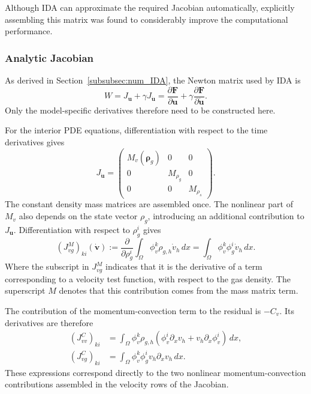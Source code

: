 Although IDA can approximate the required Jacobian automatically, explicitly assembling this matrix was found to considerably improve the computational performance.

\subsubsection{Analytic Jacobian}

As derived in Section~\ref{subsubsec:num_IDA}, the Newton matrix used by IDA is
\begin{equation}\label{eq:model4_IDA_jacobian}
W=J_{\mathbf u}+\gamma J_{\dot{\mathbf u}}
=\frac{\partial\mathbf F}{\partial\mathbf u}
+\gamma\frac{\partial\mathbf F}{\partial\dot{\mathbf u}}.
\end{equation}
Only the model-specific derivatives therefore need to be constructed here.

For the interior PDE equations, differentiation with respect to the time derivatives gives
\begin{equation}\label{eq:model4_Jdu}
J_{\dot{\mathbf u}}=
\begin{pmatrix}
M_v(\boldsymbol\rho_g)&0&0\\
0&M_{\rho_g}&0\\
0&0&M_{\rho_s}
\end{pmatrix}.
\end{equation}
The constant density mass matrices are assembled once. The nonlinear part of $M_v$ also depends on the state vector $\rho_g$, introducing an additional contribution to $J_{\mathbf u}$. Differentiation with respect to $\rho_g^i$ gives
\begin{equation}\label{eq:model4_JuM}
\left(J_{vg}^M\right)_{ki}(\dot{\mathbf v})
:=
\frac{\partial}{\partial\rho_g^i}
\int_\Omega\phi_v^k\rho_{g,h}\dot v_h\,dx
=
\int_\Omega\phi_v^k\phi_g^i\dot v_h\,dx.
\end{equation}
Where the subscript in $J_{vg}^M$ indicates that it is the derivative of a term corresponding to a velocity test function, with respect to the gas density. The superscript $M$ denotes that this contribution comes from the mass matrix term.

The contribution of the momentum-convection term to the residual is $-C_v$. Its derivatives are therefore
\begin{align}
(J_{vv}^{C})_{ki}
&=\int_\Omega\phi_v^k\rho_{g,h}
\left(\phi_v^i\partial_xv_h+v_h\partial_x\phi_v^i\right)\,dx,\\
(J_{vg}^{C})_{ki}
&=\int_\Omega\phi_v^k\phi_g^iv_h\partial_xv_h\,dx.
\end{align}
These expressions correspond directly to the two nonlinear momentum-convection contributions assembled in the velocity rows of the Jacobian.

